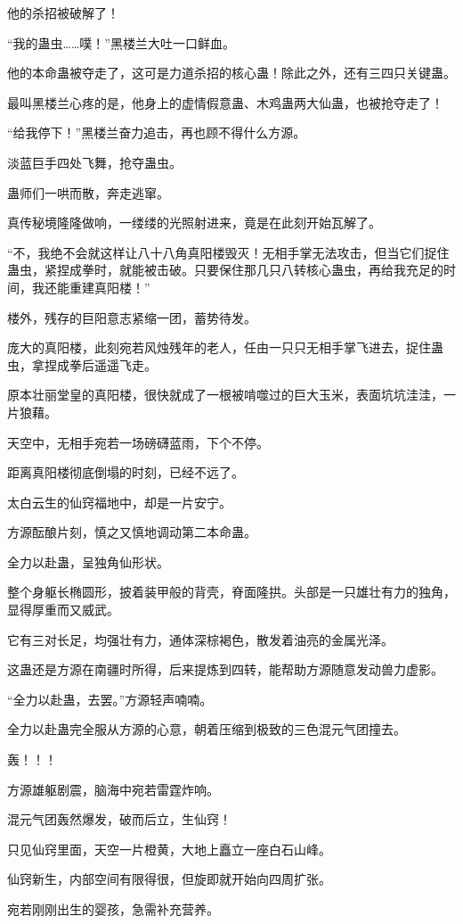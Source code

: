 \begin{this_body}
他的杀招被破解了！

“我的蛊虫……噗！”黑楼兰大吐一口鲜血。

他的本命蛊被夺走了，这可是力道杀招的核心蛊！除此之外，还有三四只关键蛊。

最叫黑楼兰心疼的是，他身上的虚情假意蛊、木鸡蛊两大仙蛊，也被抢夺走了！

“给我停下！”黑楼兰奋力追击，再也顾不得什么方源。

淡蓝巨手四处飞舞，抢夺蛊虫。

蛊师们一哄而散，奔走逃窜。

真传秘境隆隆做响，一缕缕的光照射进来，竟是在此刻开始瓦解了。

“不，我绝不会就这样让八十八角真阳楼毁灭！无相手掌无法攻击，但当它们捉住蛊虫，紧捏成拳时，就能被击破。只要保住那几只八转核心蛊虫，再给我充足的时间，我还能重建真阳楼！”

楼外，残存的巨阳意志紧缩一团，蓄势待发。

庞大的真阳楼，此刻宛若风烛残年的老人，任由一只只无相手掌飞进去，捉住蛊虫，拿捏成拳后遥遥飞走。

原本壮丽堂皇的真阳楼，很快就成了一根被啃噬过的巨大玉米，表面坑坑洼洼，一片狼藉。

天空中，无相手宛若一场磅礴蓝雨，下个不停。

距离真阳楼彻底倒塌的时刻，已经不远了。

太白云生的仙窍福地中，却是一片安宁。

方源酝酿片刻，慎之又慎地调动第二本命蛊。

全力以赴蛊，呈独角仙形状。

整个身躯长椭圆形，披着装甲般的背壳，脊面隆拱。头部是一只雄壮有力的独角，显得厚重而又威武。

它有三对长足，均强壮有力，通体深棕褐色，散发着油亮的金属光泽。

这蛊还是方源在南疆时所得，后来提炼到四转，能帮助方源随意发动兽力虚影。

“全力以赴蛊，去罢。”方源轻声喃喃。

全力以赴蛊完全服从方源的心意，朝着压缩到极致的三色混元气团撞去。

轰！！！

方源雄躯剧震，脑海中宛若雷霆炸响。

混元气团轰然爆发，破而后立，生仙窍！

只见仙窍里面，天空一片橙黄，大地上矗立一座白石山峰。

仙窍新生，内部空间有限得很，但旋即就开始向四周扩张。

宛若刚刚出生的婴孩，急需补充营养。


\end{this_body}
